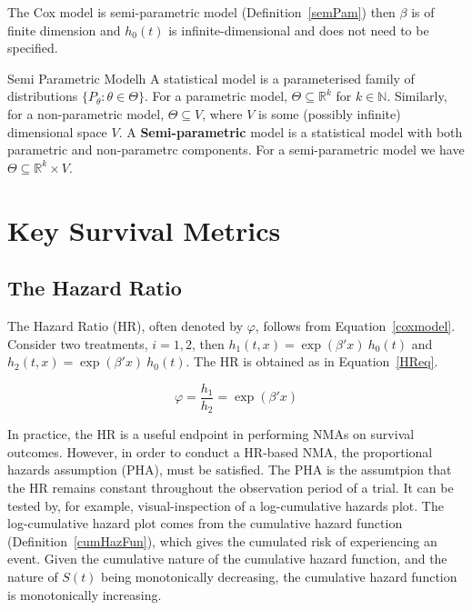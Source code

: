 The Cox model is semi-parametric model (Definition~\ref{semPam}) then $\beta$ is of finite dimension and $h_0(t)$ is infinite-dimensional and does not need to be specified. 

\begin{definition}[label=semPam]{Semi Parametric Model}{h}
    A statistical model is a parameterised family of distributions $\{P_{\theta} : \theta \in \Theta\}$. 
    For a parametric model, $\Theta \subseteq \mathbb{R}^k$ for $k \in \mathbb{N}$. Similarly, for a non-parametric model, $\Theta \subseteq V$, where $V$ is some (possibly infinite) dimensional space $V$. A \textbf{Semi-parametric} model is a statistical model with both parametric and non-parametrc components. For a semi-parametric model we have $\Theta \subseteq \mathbb{R}^k \times V$.
\end{definition}


\section{Key Survival Metrics}

\subsection{The Hazard Ratio}
The Hazard Ratio (HR), often denoted by $\varphi$, follows from Equation~\ref{coxmodel}. Consider two treatments, $i = 1, 2$, then $h_1(t, x) = \exp(\beta'x) \ h_0(t)$ and $h_2(t, x) = \exp(\beta'x) \ h_0(t)$. The HR is obtained as in Equation~\ref{HReq}.

\begin{equation}
    \varphi = \frac{h_1}{h_2} = \exp(\beta' x)
    \label{HReq}
\end{equation}

In practice, the HR is a useful endpoint in performing NMAs on survival outcomes. However, in order to conduct a HR-based NMA, the proportional hazards assumption (PHA), must be satisfied. The PHA is the assumtpion that the HR remains constant throughout the observation period of a trial. It can be tested by, for example, visual-inspection of a log-cumulative hazards plot. The log-cumulative hazard plot comes from the cumulative hazard function (Definition~\ref{cumHazFun}), which gives the cumulated risk of experiencing an event. Given the cumulative nature of the cumulative hazard function, and the nature of $S(t)$ being monotonically decreasing, the cumulative hazard function is monotonically increasing.

